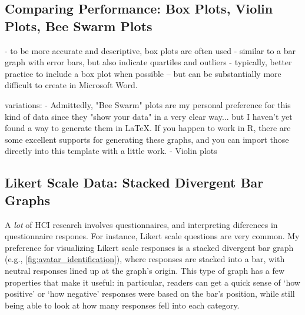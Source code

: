 \newpage
\subsection{Comparing Performance: Box Plots, Violin Plots, Bee Swarm Plots}


- to be more accurate and descriptive, box plots are often used
- similar to a bar graph with error bars, but also indicate quartiles and outliers 
- typically, better practice to include a box plot when possible -- but can be substantially more difficult to create in Microsoft Word. 

variations: 
- Admittedly, "Bee Swarm" plots are my personal preference for this kind of data since they "show your data" in a very clear way... but I haven't yet found a  way to generate them in \LaTeX. If you happen to work in R, there are some excellent supports for generating these graphs, and you can import those directly into this template with a little work. 
- Violin plots 




\newpage
\subsection{Likert Scale Data: Stacked Divergent Bar Graphs}

A \emph{lot} of HCI research involves questionnaires, and interpreting diferences in questionnaire respones. For instance, Likert scale questions are very common. My preference for visualizing Likert scale responses is a stacked divergent bar graph (e.g., \autoref{fig:avatar_identification}), where responses are stacked into a bar, with neutral responses lined up at the graph's origin. This type of graph has a few properties that make it useful: in particular, readers can get a quick sense of `how positive' or `how negative' responses were based on the bar's position, while still being able to look at how many responses fell into each category. 

